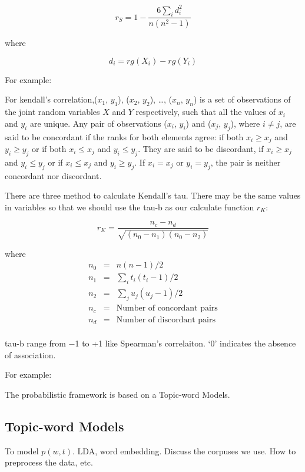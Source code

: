 \begin{equation*}
r_{S} = {1-{\frac {6\sum_i d_{i}^{2}}{n(n^{2}-1)}}}
\end{equation*}

where

\begin{equation*}
d_{i} = {rg}(X_{i})-{rg}(Y_{i})
\end{equation*}

For example:

For kendall's correlation,($ x_{1}$, $y_{1}$), ($x_{2}$, $y_{2}$), …, ($x_{n}$, $y_{n}$) 
is a set of observations of the joint random variables $X$ and $Y$ respectively, 
such that all the values of $x_{i}$ and $y_{i}$ are unique. 
Any pair of observations ($x_{i}$, $y_{i}$) and ($x_{j}$, $y_{j}$), where $i\not=j$, 
are said to be concordant if the ranks for both elements agree: 
if both $x_{i} \ge x_{j}$ and $y_{i} \ge y_{j}$ or if both $x_{i} \le x_{j}$ and $y_{i} \le y_{j}$. 
They are said to be discordant, if $x_{i} \ge x_{j}$ and $y_{i} \le y_{j}$ or 
if $x_{i} \le x_{j}$ and $y_{i} \ge y_{j}$. If $x_{i}=x_{j}$ or $y_{i}= y_{j}$, the pair is neither 
concordant nor discordant.

There are three method to calculate Kendall's tau. There may be the same values in 
variables so that we should use the tau-b as our calculate function $r_{K}$:

\begin{equation*}
r_{K} = {\frac {n_{c}-n_{d}}{\sqrt {(n_{0}-n_{1})(n_{0}-n_{2})}}}
\end{equation*}

where
\begin{eqnarray*}
n_{0}&=&n(n-1)/2\\
n_{1}&=&\sum_i t_{i}(t_{i}-1)/2\\
n_{2}&=&\sum_j u_{j}(u_{j}-1)/2\\
n_{c}&=&{\text{Number of concordant pairs}}\\
n_{d}&=&{\text{Number of discordant pairs}}\\
\end{eqnarray*}

tau-b range from −1 to +1 like Spearman's correlaiton. `0' indicates the absence of association.

For example:

The probabilistic framework is based on a Topic-word Models.
\subsection{Topic-word Models}
To model $p(w, t)$. 
LDA, word embedding. Discuss the corpuses we use. How to preprocess 
the data, etc.

